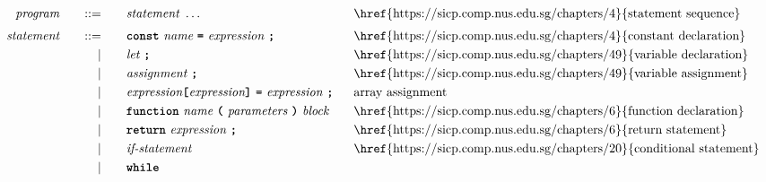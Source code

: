 \begin{alignat*}{9}
&& \textit{program}    &&\quad ::= &\quad && \textit{statement} \ \ldots
                                                           && \textrm{\href{https://sicp.comp.nus.edu.sg/chapters/4}{statement sequence}} \\[1mm]
&& \textit{statement}    &&\quad ::= &\quad && \textbf{\texttt{const}}\  \textit{name} \ 
                                           \textbf{\texttt{=}}\  \textit{expression} \ \textbf{\texttt{;}}
                                                           && \textrm{\href{https://sicp.comp.nus.edu.sg/chapters/4}{constant declaration}} \\
&&                       && |   &\quad && \textit{let} \ \textbf{\texttt{;}}
                                                           && \textrm{\href{https://sicp.comp.nus.edu.sg/chapters/49}{variable declaration}} \\
&&                       && |   &\quad && \textit{assignment} \ \textbf{\texttt{;}}
                                                           && \textrm{\href{https://sicp.comp.nus.edu.sg/chapters/49}{variable assignment}} \\
&&                       && |   &\quad && \textit{expression} \textbf{\texttt{[}}
                                          \textit{expression} \textbf{\texttt{]}} \ 
                                           \textbf{\texttt{=}}\  \textit{expression} \ \textbf{\texttt{;}}
                                                           && \textrm{array assignment} \\
&&                       && |   &\quad && \textbf{\texttt{function}}\  \textit{name} \ 
                                   \textbf{\texttt{(}}\  \textit{parameters} \ \textbf{\texttt{)}}\ \textit{block} \quad
                                                           && \textrm{\href{https://sicp.comp.nus.edu.sg/chapters/6}{function declaration}}\\
&&                       && |   &\quad && \textbf{\texttt{return}}\  \textit{expression} \ \textbf{\texttt{;}}
                                                           && \textrm{\href{https://sicp.comp.nus.edu.sg/chapters/6}{return statement}}\\
&&                       && |   &\quad && \textit{if-statement} \quad
                                                           && \textrm{\href{https://sicp.comp.nus.edu.sg/chapters/20}{conditional statement}}\\
&&                       && |   &\quad && \textbf{\texttt{while}}\  

\end{alignat*}
